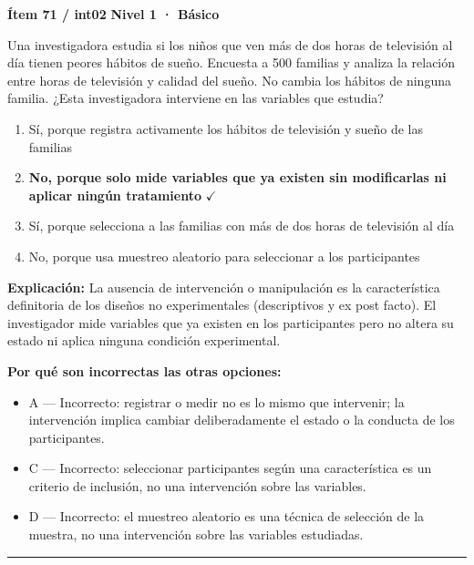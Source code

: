 \documentclass[12pt,a4paper]{article}
\begin{document}
\begin{mdframed}[backgroundcolor=fondogris,linecolor=azul,linewidth=1pt,innerleftmargin=10pt,innerrightmargin=10pt,innertopmargin=7pt,innerbottommargin=7pt]
\textbf{Ítem 71 / int02} \hfill {\small\bfseries\color{azul} Nivel 1 · Básico}
\end{mdframed}

Una investigadora estudia si los niños que ven más de dos horas de televisión al día tienen peores hábitos de sueño. Encuesta a 500 familias y analiza la relación entre horas de televisión y calidad del sueño. No cambia los hábitos de ninguna familia. ¿Esta investigadora interviene en las variables que estudia?

\begin{enumerate}
  \item[A.] Sí, porque registra activamente los hábitos de televisión y sueño de las familias
  \item[\textbf{\color{verde}B.}] \textbf{\color{verde} No, porque solo mide variables que ya existen sin modificarlas ni aplicar ningún tratamiento} \hfill $\checkmark$
  \item[C.] Sí, porque selecciona a las familias con más de dos horas de televisión al día
  \item[D.] No, porque usa muestreo aleatorio para seleccionar a los participantes
\end{enumerate}

\noindent\textbf{\color{azul}Explicación:} La ausencia de intervención o manipulación es la característica definitoria de los diseños no experimentales (descriptivos y ex post facto). El investigador mide variables que ya existen en los participantes pero no altera su estado ni aplica ninguna condición experimental.

\noindent\textbf{\color{gris}Por qué son incorrectas las otras opciones:}
\begin{itemize}
  \item {\small A — Incorrecto: registrar o medir no es lo mismo que intervenir; la intervención implica cambiar deliberadamente el estado o la conducta de los participantes.}
  \item {\small C — Incorrecto: seleccionar participantes según una característica es un criterio de inclusión, no una intervención sobre las variables.}
  \item {\small D — Incorrecto: el muestreo aleatorio es una técnica de selección de la muestra, no una intervención sobre las variables estudiadas.}
\end{itemize}
\vspace{8pt}\hrule\vspace{10pt}
\end{document}
